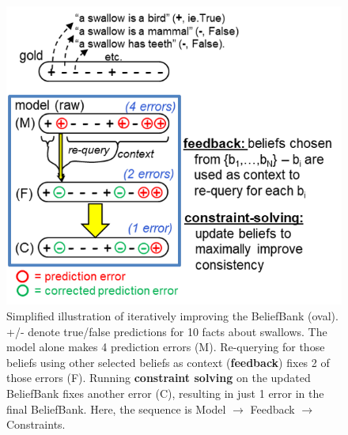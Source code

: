 \documentclass[11pt]{article}
\newcommand{\nk}[1]{\textcolor{green}{Nora: #1}}
\begin{document}
\begin{figure}[t]
\centering
     \includegraphics[width=1\columnwidth]{progression.png}	   %
\caption{Simplified illustration of iteratively improving the BeliefBank (oval). +/- denote true/false predictions for 10 facts about swallows. The model alone makes 4 prediction errors (M). Re-querying for those beliefs using other selected beliefs as context ({\bf feedback}) fixes 2 of those errors (F). Running {\bf constraint solving} on the updated BeliefBank fixes another error (C), resulting in just 1 error in the final BeliefBank. Here, the sequence is Model $\rightarrow$ Feedback $\rightarrow$ Constraints.\label{progression}}
\end{figure}
\end{document}
